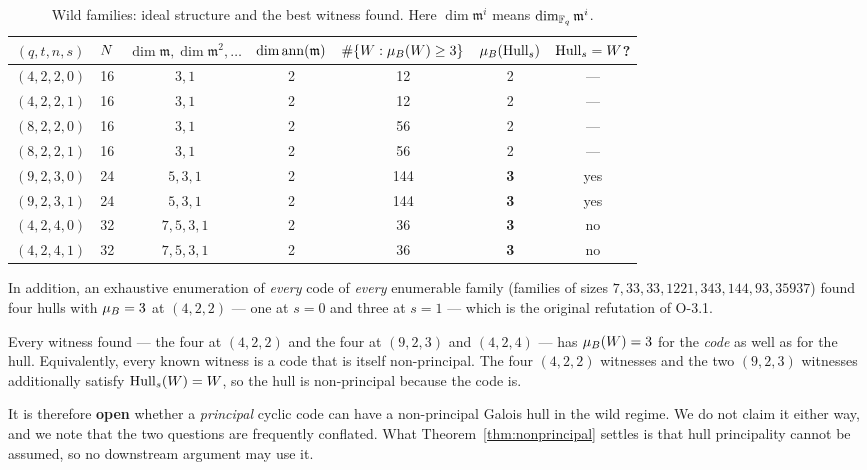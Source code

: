 \begin{table}[ht]
\centering
\caption{Wild families: ideal structure and the best witness found. Here
$\dim\mathfrak m^i$ means $\dim_{\mathbb F_q}\mathfrak m^i$.}
\label{tab:witnesses}
\small
\begin{tabular}{@{}ccccccc@{}}
\toprule
$(q,t,n,s)$ & $N$ & $\dim\mathfrak m,\dim\mathfrak m^2,\dots$
 & $\dim\operatorname{ann}(\mathfrak m)$ & $\#\{W:\mu_{B}(W)\ge3\}$
 & $\mu_{B}(\operatorname{Hull}_s)$ & $\operatorname{Hull}_s=W$? \\
\midrule
$(4,2,2,0)$ & 16 & $3,1$ & 2 & 12 & 2 & --- \\
$(4,2,2,1)$ & 16 & $3,1$ & 2 & 12 & 2 & --- \\
$(8,2,2,0)$ & 16 & $3,1$ & 2 & 56 & 2 & --- \\
$(8,2,2,1)$ & 16 & $3,1$ & 2 & 56 & 2 & --- \\
$(9,2,3,0)$ & 24 & $5,3,1$ & 2 & 144 & \textbf{3} & yes \\
$(9,2,3,1)$ & 24 & $5,3,1$ & 2 & 144 & \textbf{3} & yes \\
$(4,2,4,0)$ & 32 & $7,5,3,1$ & 2 & 36 & \textbf{3} & no \\
$(4,2,4,1)$ & 32 & $7,5,3,1$ & 2 & 36 & \textbf{3} & no \\
\bottomrule
\end{tabular}
\end{table}

In addition, an exhaustive enumeration of \emph{every} code of \emph{every}
enumerable family (families of sizes $7,33,33,1221,343,144,93,35937$) found
four hulls with $\mu_{B}=3$ at $(4,2,2)$ --- one at $s=0$ and three at $s=1$
--- which is the original refutation of O-3.1.

\begin{remark}\label{rem:o31b}
Every witness found --- the four at $(4,2,2)$ and the four at $(9,2,3)$ and
$(4,2,4)$ --- has $\mu_{B}(W)=3$ for the \emph{code} as well as for the
hull. Equivalently, every known witness is a code that is itself
non-principal. The four $(4,2,2)$ witnesses and the two $(9,2,3)$ witnesses
additionally satisfy $\operatorname{Hull}_s(W)=W$, so the hull is non-principal because the
code is.

It is therefore \textbf{open} whether a \emph{principal} cyclic code can have a
non-principal Galois hull in the wild regime. We do not claim it either way,
and we note that the two questions are frequently conflated. What
Theorem~\ref{thm:nonprincipal} settles is that hull principality cannot be
assumed, so no downstream argument may use it.
\end{remark}

